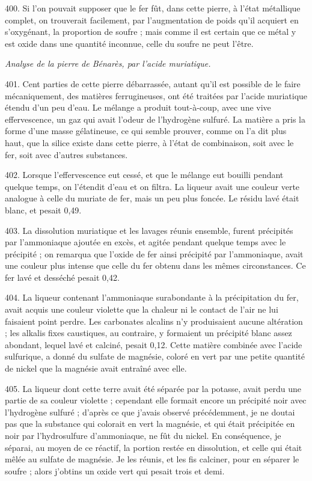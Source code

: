 \documentclass[a4paper, 11pt, oneside, polutonikogreek, french]{article}
\begin{document}
400. Si l'on pouvait supposer que le fer fût, dans cette pierre, à l'état métallique complet, on trouverait facilement, par l'augmentation de poids qu'il acquiert en s'oxygénant, la proportion de soufre ; mais comme il est certain que ce métal y est oxide dans une quantité inconnue, celle du soufre ne peut l'être.

\begin{center}
\emph{Analyse de la pierre de Bénarès, par l'acide muriatique.}
\end{center}

401. Cent parties de cette pierre débarrassée, autant qu'il est possible de le faire mécaniquement, des matières ferrugineuses, ont été traitées par l'acide muriatique étendu d'un peu d'eau. Le mélange a produit tout-à-coup, avec une vive effervescence, un gaz qui avait l'odeur de l'hydrogène sulfuré. La matière a pris la forme d'une masse gélatineuse, ce qui semble prouver, comme on l'a dit plus haut, que la silice existe dans cette pierre, à l'état de combinaison, soit avec le fer, soit avec d'autres substances.

402. Lorsque l'effervescence eut cessé, et que le mélange eut bouilli pendant quelque temps, on l'étendit d'eau et on filtra. La liqueur avait une couleur verte analogue à celle du muriate de fer, mais un peu plus foncée. Le résidu lavé était blanc, et pesait 0,49.

403. La dissolution muriatique et les lavages réunis ensemble, furent précipités par l'ammoniaque ajoutée en excès, et agitée pendant quelque temps avec le précipité ; on remarqua que l'oxide de fer ainsi précipité par l'ammoniaque, avait une couleur plus intense que celle du fer obtenu dans les mêmes circonstances. Ce fer lavé et desséché pesait 0,42.

404. La liqueur contenant l'ammoniaque surabondante à la précipitation du fer, avait acquis une couleur violette que la chaleur ni le contact de l'air ne lui faisaient point perdre. Les carbonates alcalins n'y produisaient aucune altération ; les alkalis fixes caustiques, au contraire, y formaient un précipité blanc assez abondant, lequel lavé et calciné, pesait 0,12. Cette matière combinée avec l'acide sulfurique, a donné du sulfate de magnésie, coloré en vert par une petite quantité de nickel que la magnésie avait entraîné avec elle.

405. La liqueur dont cette terre avait été séparée par la potasse, avait perdu une partie de sa couleur violette ; cependant elle formait encore un précipité noir avec l'hydrogène sulfuré ; d'après ce que j'avais observé précédemment, je ne doutai pas que la substance qui colorait en vert la magnésie, et qui était précipitée en noir par l'hydrosulfure d'ammoniaque, ne fût du nickel. En conséquence, je séparai, au moyen de ce réactif, la portion restée en dissolution, et celle qui était mêlée au sulfate de magnésie. Je les réunis, et les fis calciner, pour en séparer le soufre ; alors j'obtins un oxide vert qui pesait trois et demi.
\end{document}
